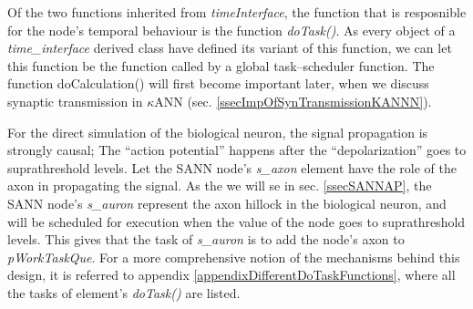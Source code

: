 	Of the two functions inherited from \emph{timeInterface}, %
		the function that is resposnible for the node's temporal behaviour is the function \emph{doTask()}.
	As every object of a \emph{time\_interface} derived class have defined its variant of this function, we can let this function be the function called by a global task--scheduler function. %
	The function doCalculation() will first become important later, when we discuss synaptic transmission in $\kappa$ANN (sec. \ref{ssecImpOfSynTransmissionKANNN}). 
	 



	For the direct simulation of the biological neuron, the signal propagation is strongly causal; The ``action potential'' happens after the ``depolarization'' goes to suprathreshold levels.
	Let the SANN node's \emph{s\_axon} element have the role of the axon in propagating the signal.
	As the we will se in sec. \ref{ssecSANNAP}, the SANN node's \emph{s\_auron} represent the axon hillock in the biological neuron, and will be scheduled for execution when the value of the node goes to suprathreshold levels.
	This gives that the task of \emph{s\_auron} is to add the node's axon to \emph{pWorkTaskQue}.
	For a more comprehensive notion of the mechanisms behind this design, it is referred to appendix \ref{appendixDifferentDoTaskFunctions}, where all the tasks of element's \emph{doTask()} are listed.

